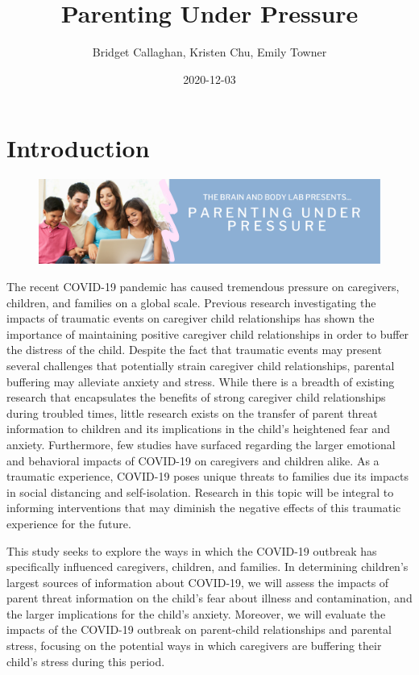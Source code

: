 \documentclass[]{book}
\title{Parenting Under Pressure}
\author{Bridget Callaghan, Kristen Chu, Emily Towner}
\date{2020-12-03}
\begin{document}
\maketitle

{
\setcounter{tocdepth}{1}
\tableofcontents
}
\hypertarget{introduction}{%
\chapter{Introduction}\label{introduction}}

\begin{figure}
\centering
\includegraphics{images/PUP_header.png}
\caption{}
\end{figure}

The recent COVID-19 pandemic has caused tremendous pressure on caregivers, children, and families on a global scale. Previous research investigating the impacts of traumatic events on caregiver child relationships has shown the importance of maintaining positive caregiver child relationships in order to buffer the distress of the child. Despite the fact that traumatic events may present several challenges that potentially strain caregiver child relationships, parental buffering may alleviate anxiety and stress. While there is a breadth of existing research that encapsulates the benefits of strong caregiver child relationships during troubled times, little research exists on the transfer of parent threat information to children and its implications in the child's heightened fear and anxiety. Furthermore, few studies have surfaced regarding the larger emotional and behavioral impacts of COVID-19 on caregivers and children alike. As a traumatic experience, COVID-19 poses unique threats to families due its impacts in social distancing and self-isolation. Research in this topic will be integral to informing interventions that may diminish the negative effects of this traumatic experience for the future.

This study seeks to explore the ways in which the COVID-19 outbreak has specifically influenced caregivers, children, and families. In determining children's largest sources of information about COVID-19, we will assess the impacts of parent threat information on the child's fear about illness and contamination, and the larger implications for the child's anxiety. Moreover, we will evaluate the impacts of the COVID-19 outbreak on parent-child relationships and parental stress, focusing on the potential ways in which caregivers are buffering their child's stress during this period.
\end{document}
